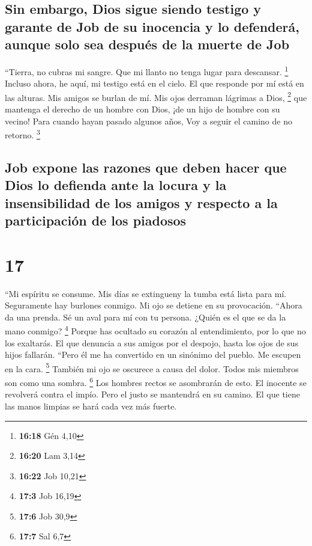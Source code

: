 \hypertarget{sin-embargo-dios-sigue-siendo-testigo-y-garante-de-job-de-su-inocencia-y-lo-defenderuxe1-aunque-solo-sea-despuuxe9s-de-la-muerte-de-job}{%
\subsection{Sin embargo, Dios sigue siendo testigo y garante de Job de
su inocencia y lo defenderá, aunque solo sea después de la muerte de
Job}\label{sin-embargo-dios-sigue-siendo-testigo-y-garante-de-job-de-su-inocencia-y-lo-defenderuxe1-aunque-solo-sea-despuuxe9s-de-la-muerte-de-job}}

 ``Tierra, no cubras mi sangre. Que mi llanto no tenga
lugar para descansar. \footnote{\textbf{16:18} Gén 4,10} 
Incluso ahora, he aquí, mi testigo está en el cielo. El que responde por
mí está en las alturas.  Mis amigos se burlan de mí. Mis
ojos derraman lágrimas a Dios, \footnote{\textbf{16:20} Lam 3,14}
 que mantenga el derecho de un hombre con Dios, ¡de un
hijo de hombre con su vecino!  Para cuando hayan pasado
algunos años, Voy a seguir el camino de no retorno. \footnote{\textbf{16:22}
  Job 10,21}

\hypertarget{job-expone-las-razones-que-deben-hacer-que-dios-lo-defienda-ante-la-locura-y-la-insensibilidad-de-los-amigos-y-respecto-a-la-participaciuxf3n-de-los-piadosos}{%
\subsection{Job expone las razones que deben hacer que Dios lo defienda
ante la locura y la insensibilidad de los amigos y respecto a la
participación de los
piadosos}\label{job-expone-las-razones-que-deben-hacer-que-dios-lo-defienda-ante-la-locura-y-la-insensibilidad-de-los-amigos-y-respecto-a-la-participaciuxf3n-de-los-piadosos}}

\hypertarget{section-16}{%
\section{17}\label{section-16}}

 ``Mi espíritu se consume. Mis días se extingueny la tumba
está lista para mí.  Seguramente hay burlones conmigo. Mi
ojo se detiene en su provocación.  ``Ahora da una prenda.
Sé un aval para mí con tu persona. ¿Quién es el que se da la mano
conmigo? \footnote{\textbf{17:3} Job 16,19}  Porque has
ocultado su corazón al entendimiento, por lo que no los exaltarás.
 El que denuncia a sus amigos por el despojo, hasta los
ojos de sus hijos fallarán.  ``Pero él me ha convertido en
un sinónimo del pueblo. Me escupen en la cara. \footnote{\textbf{17:6}
  Job 30,9}  También mi ojo se oscurece a causa del dolor.
Todos mis miembros son como una sombra. \footnote{\textbf{17:7} Sal 6,7}
 Los hombres rectos se asombrarán de esto. El inocente se
revolverá contra el impío.  Pero el justo se mantendrá en
su camino. El que tiene las manos limpias se hará cada vez más fuerte.

